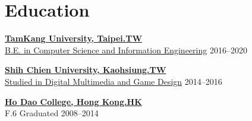 \section{Education}

\begin{entrylist}

\item \href{https://www.tku.edu.tw/}{\textbf{TamKang University, Taipei.TW}} \\
    \href{https://www.csie.tku.edu.tw/}{B.E. in Computer Science and Information Engineering} \hfill 2016--2020 \\
\item \href{https://www.usc.edu.tw/}{\textbf{Shih Chien University, Kaohsiung.TW}} \\
    \href{https://csd.kh.usc.edu.tw/}{Studied in Digital Multimedia and Game Design} 
    \hfill 2014--2016 \\
\item \href{https://www.hodao.edu.hk/}{\textbf{Ho Dao College, Hong Kong.HK}} \\
    F.6 Graduated 
    \hfill 2008--2014\\
\end{entrylist}
